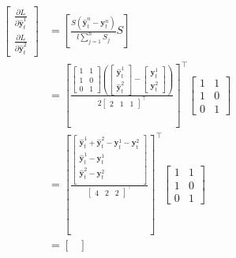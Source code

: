 \documentclass[preprint, 3p, times, twocolumn]{elsarticle}
\begin{document}
\begin{align} 
  \begin{bmatrix}
  \frac{\partial L}{\partial \hat{\textbf{y}}^1_{t}} \\
  \frac{\partial L}{\partial \hat{\textbf{y}}^2_{t}}
  \end{bmatrix} 
  &= \left[ \frac{S(\hat{\textbf{y}}^n_{t} - \textbf{y}^n_{t})}{l \sum_{j=1}^n S_{j}} S \right] \\
  &=  \left[ \frac{
    \begin{bmatrix}
      1 &1 \\
      1 &0 \\
      0 &1
    \end{bmatrix}
    \left(  
    \begin{bmatrix}
      \hat{\textbf{y}}^1_{t} \\
      \hat{\textbf{y}}^2_{t}
    \end{bmatrix}  
    - 
    \begin{bmatrix}
      \textbf{y}^1_{t} \\
      \textbf{y}^2_{t}
    \end{bmatrix}  
    \right)
    }{2 
    \begin{bmatrix}
      2 &1 &1
    \end{bmatrix}^\intercal  
    } \right]^\intercal
    \begin{bmatrix}
      1 &1 \\
      1 &0 \\
      0 &1
    \end{bmatrix} \\
  &=  \left[ \frac{
    \begin{bmatrix}
      \hat{\textbf{y}}^1_{t} + \hat{\textbf{y}}^2_{t} - \textbf{y}^1_{t} - \textbf{y}^2_{t} \\
      \hat{\textbf{y}}^1_{t} - \textbf{y}^1_{t} \\
      \hat{\textbf{y}}^2_{t} - \textbf{y}^2_{t} \\
    \end{bmatrix}
    }{ 
    \begin{bmatrix}
      4 &2 &2
    \end{bmatrix}^\intercal  
    } \right]^\intercal
    \begin{bmatrix}
      1 &1 \\
      1 &0 \\
      0 &1
    \end{bmatrix} \\
  &=          
   \begin{bmatrix}

\end{bmatrix}
\end{align}
\end{document}
